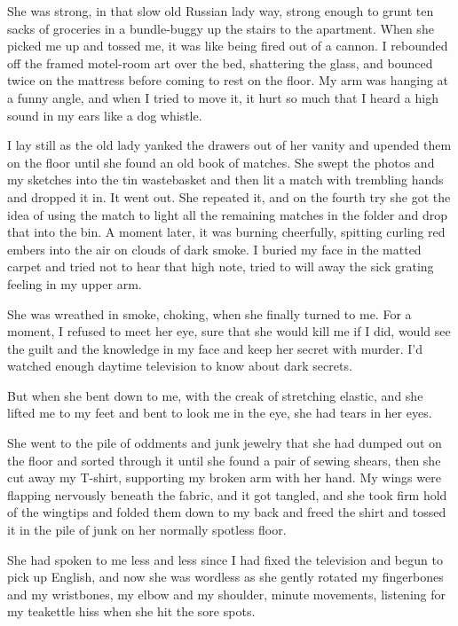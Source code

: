 She was strong, in that slow old Russian lady way, strong enough to
grunt ten sacks of groceries in a bundle-buggy up the stairs to the
apartment.  When she picked me up and tossed me, it was like being
fired out of a cannon.  I rebounded off the framed motel-room art over
the bed, shattering the glass, and bounced twice on the mattress
before coming to rest on the floor.  My arm was hanging at a funny
angle, and when I tried to move it, it hurt so much that I heard a
high sound in my ears like a dog whistle.

I lay still as the old lady yanked the drawers out of her vanity and
upended them on the floor until she found an old book of matches.  She
swept the photos and my sketches into the tin wastebasket and then lit
a match with trembling hands and dropped it in.  It went out.  She
repeated it, and on the fourth try she got the idea of using the match
to light all the remaining matches in the folder and drop that into
the bin.  A moment later, it was burning cheerfully, spitting curling
red embers into the air on clouds of dark smoke.  I buried my face in
the matted carpet and tried not to hear that high note, tried to will
away the sick grating feeling in my upper arm.

She was wreathed in smoke, choking, when she finally turned to me. 
For a moment, I refused to meet her eye, sure that she would kill me
if I did, would see the guilt and the knowledge in my face and keep
her secret with murder.  I'd watched enough daytime television to know
about dark secrets.

But when she bent down to me, with the creak of stretching elastic,
and she lifted me to my feet and bent to look me in the eye, she had
tears in her eyes.

She went to the pile of oddments and junk jewelry that she had dumped
out on the floor and sorted through it until she found a pair of
sewing shears, then she cut away my T-shirt, supporting my broken arm
with her hand.  My wings were flapping nervously beneath the fabric,
and it got tangled, and she took firm hold of the wingtips and folded
them down to my back and freed the shirt and tossed it in the pile of
junk on her normally spotless floor.

She had spoken to me less and less since I had fixed the television
and begun to pick up English, and now she was wordless as she gently
rotated my fingerbones and my wristbones, my elbow and my shoulder,
minute movements, listening for my teakettle hiss when she hit the
sore spots.


